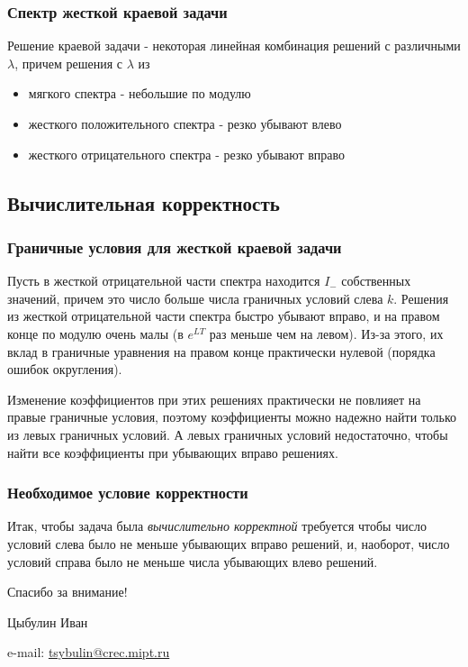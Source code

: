 \documentclass[professionalfonts,compress,unicode,aspectratio=169]{beamer}
\newcommand{\colorhref}[2]{\href{#1}{\textcolor{miptbase!30!black}{#2}}}
\begin{document}
\begin{frame}\frametitle{Спектр жесткой краевой задачи}
	Решение краевой задачи - некоторая линейная комбинация решений с различными $\lambda$, причем
	решения с $\lambda$ из
	\begin{itemize}
		\item мягкого спектра - небольшие по модулю
		\item жесткого положительного спектра - резко убывают влево
		\item жесткого отрицательного спектра - резко убывают вправо
	\end{itemize}
\end{frame}

\subsection{Вычислительная корректность}
\begin{frame}\frametitle{Граничные условия для жесткой краевой задачи}
	Пусть в жесткой отрицательной части спектра находится $I_-$ собственных значений, причем это число больше числа граничных условий слева $k$.
	Решения из жесткой отрицательной части спектра быстро убывают вправо, и на правом конце по модулю очень малы (в $e^{LT}$ раз меньше чем на левом).
	Из-за этого, их вклад в граничные уравнения на правом конце практически нулевой (порядка ошибок округления).

	Изменение коэффициентов при этих решениях практически не повлияет на правые граничные условия, поэтому коэффициенты можно надежно найти только из левых граничных
	условий. А левых граничных условий недостаточно, чтобы найти все коэффициенты при убывающих вправо решениях.
\end{frame}

\begin{frame}\frametitle{Необходимое условие корректности}
	Итак, чтобы задача была \emph{вычислительно корректной} требуется чтобы число условий слева было не меньше убывающих вправо решений, и, наоборот,
	число условий справа было не меньше числа убывающих влево решений.
\end{frame}

\begin{frame}[plain]
  \begin{center}
  {\Huge Спасибо за внимание!}
  \vspace{8ex}

  Цыбулин Иван

  e-mail: \colorhref{mailto:tsybulin@crec.mipt.ru}{tsybulin@crec.mipt.ru}
  \end{center}
\end{frame}
\end{document}
